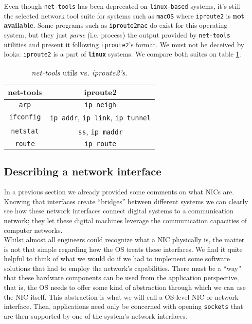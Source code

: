             Even though \texttt{net-tools} has been deprecated on \texttt{linux-based} systems, it's still the selected network tool suite for systems such as \texttt{macOS} where \texttt{iproute2} is \textbf{not available}. Some programs such as \texttt{iproute2mac} do exist for this operating system, but they just \textit{parse} (i.e. process) the output provided by \texttt{net-tools} utilities and present it following \texttt{iproute2}'s format. We must not be deceived by looks: \texttt{iproute2} is a part of \textbf{\texttt{linux}} systems. We compare both suites on table \ref{tab:net-tools-vs-iproute2}.\\

            \begin{table}
                \centering
                \begin{tabular}{|c|c|}
                    \hline
                    \textbf{net-tools} & \textbf{iproute2}\\
                    \hline
                    \texttt{arp} & \texttt{ip neigh}\\
                    \hline
                    \texttt{ifconfig} & \texttt{ip addr}, \texttt{ip link}, \texttt{ip tunnel}\\
                    \hline
                    \texttt{netstat} & \texttt{ss}, \texttt{ip maddr}\\
                    \hline
                    \texttt{route} & \texttt{ip route}\\
                    \hline
                \end{tabular}
                \caption[\textit{net-tools} vs. \textit{iproute2}]{\textit{net-tools} utils vs. \textit{iproute2's}. \cite{bib:nettools-vs-iproute2}}
                \label{tab:net-tools-vs-iproute2}
            \end{table}

        \subsection{Describing a network interface}
            In a previous section we already provided some comments on what NICs are. Knowing that interfaces create ``bridges'' between different systems we can clearly see how these network interfaces connect digital systems to a communication network; they let these digital machines leverage the communication capacities of computer networks.\\

            Whilst almost all engineers could recognize what a NIC physically is, the matter is not that simple regarding how the OS treats these interfaces. We find it quite helpful to think of what we would do if we had to implement some software solutions that had to employ the network's capabilities. There must be a ``way'' that these hardware components can be used from the application perspective, that is, the OS needs to offer some kind of abstraction through which we can use the NIC itself. This abstraction is what we will call a OS-level NIC or network interface. Then, applications need only be concerned with opening \texttt{sockets} that are then supported by one of the system's network interfaces.\\

